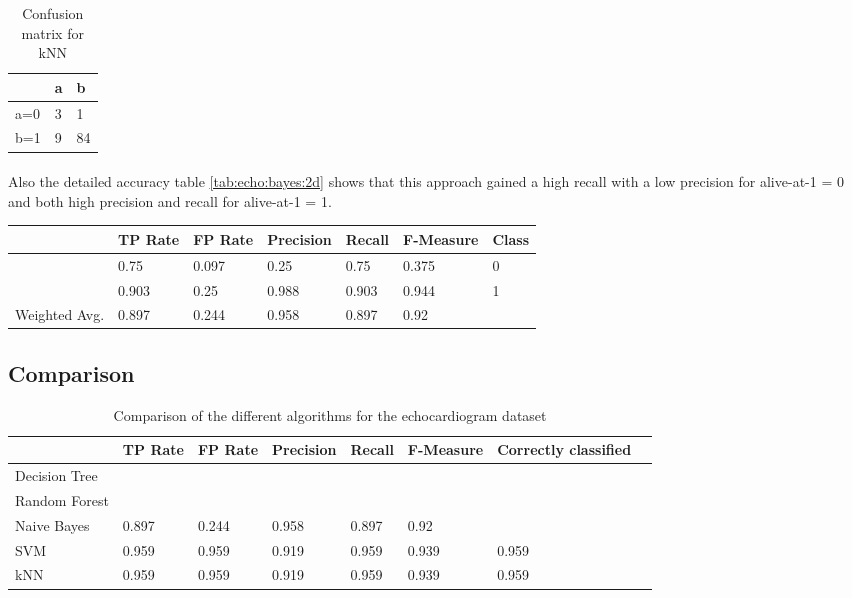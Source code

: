 \documentclass[paper=a4, fontsize=11pt]{scrartcl} %
\numberwithin{equation}{section} %
\numberwithin{figure}{section} %
\numberwithin{table}{section} %
\begin{document}
\begin{table}[h]
\centering
\begin{tabular}{|l|ll|}
\hline
 & a &	b \\
\hline
a=0 & 3 & 1 \\
b=1 & 9 & 84\\
\hline
\end{tabular}
\caption{Confusion matrix for kNN}
\label{tab:echo:bayes:2c}
\end{table}

\paragraph{}Also the detailed accuracy table \ref{tab:echo:bayes:2d} shows that this approach gained a high recall with a low precision for alive-at-1 = 0 and both high precision and recall for alive-at-1 = 1.

\begin{table*}[htb]\centering
  \begin{tabular*}{\columnwidth}{@{}lllllll@{}}
      \toprule 
              &  TP Rate & FP Rate & Precision & Recall & F-Measure & Class    \\  \midrule
              &   0.75   & 0.097   & 0.25      & 0.75   & 0.375     & 0 \\
              &   0.903  & 0.25    & 0.988     & 0.903  & 0.944     & 1 \\
Weighted Avg. &   0.897  & 0.244   & 0.958     & 0.897  & 0.92      &   \\ \bottomrule
  \end{tabular*}
\caption{Naive Bayes with SMOTE filter} 
\label{tab:echo:bayes:2d}
\end{table*}


\subsection{Comparison}

\begin{table}[h]
\centering
\begin{tabular}{llllllll}
	\toprule
									&TP Rate   	&FP Rate   &Precision &Recall  &F-Measure   &  Correctly classified\\
	\midrule
	Decision Tree		\\
  Random Forest		\\
  Naive Bayes			&0.897  		& 0.244   	& 0.958   & 0.897  &0.92      	& \\
  SVM							&0.959     	&0.959     	&0.919   	&0.959   &0.939     	&	0.959\\
  kNN							&0.959     	&0.959     	&0.919   	&0.959   &0.939     	&	0.959\\
	\bottomrule
\end{tabular}
\caption{Comparison of the different algorithms for the echocardiogram dataset}
\end{table}
\end{document}
